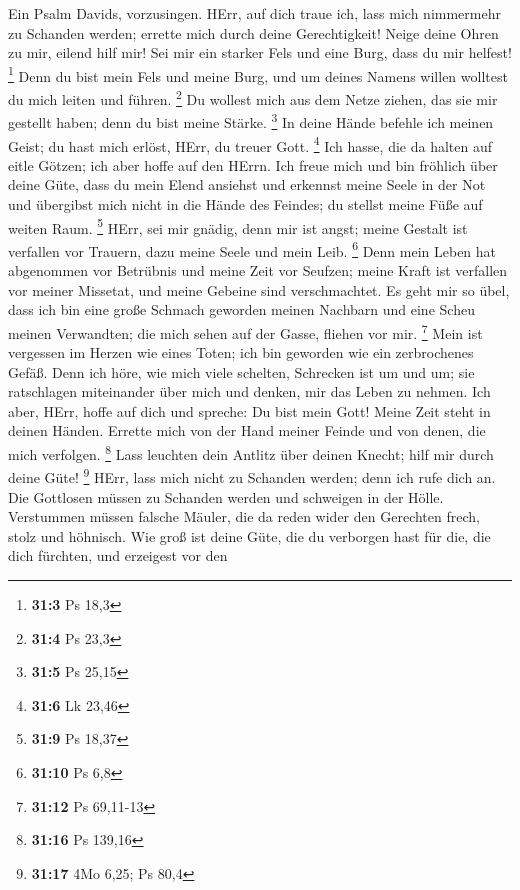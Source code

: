 Ein Psalm Davids, vorzusingen.  HErr, auf
dich traue ich, lass mich nimmermehr zu Schanden werden; errette mich
durch deine Gerechtigkeit!  Neige deine Ohren zu mir,
eilend hilf mir! Sei mir ein starker Fels und eine Burg, dass du mir
helfest! \footnote{\textbf{31:3} Ps 18,3}  Denn du bist
mein Fels und meine Burg, und um deines Namens willen wolltest du mich
leiten und führen. \footnote{\textbf{31:4} Ps 23,3}  Du
wollest mich aus dem Netze ziehen, das sie mir gestellt haben; denn du
bist meine Stärke. \footnote{\textbf{31:5} Ps 25,15}  In
deine Hände befehle ich meinen Geist; du hast mich erlöst, HErr, du
treuer Gott. \footnote{\textbf{31:6} Lk 23,46}  Ich hasse,
die da halten auf eitle Götzen; ich aber hoffe auf den HErrn.
 Ich freue mich und bin fröhlich über deine Güte, dass du
mein Elend ansiehst und erkennst meine Seele in der Not 
und übergibst mich nicht in die Hände des Feindes; du stellst meine Füße
auf weiten Raum. \footnote{\textbf{31:9} Ps 18,37}  HErr,
sei mir gnädig, denn mir ist angst; meine Gestalt ist verfallen vor
Trauern, dazu meine Seele und mein Leib. \footnote{\textbf{31:10} Ps 6,8}
 Denn mein Leben hat abgenommen vor Betrübnis und meine
Zeit vor Seufzen; meine Kraft ist verfallen vor meiner Missetat, und
meine Gebeine sind verschmachtet.  Es geht mir so übel,
dass ich bin eine große Schmach geworden meinen Nachbarn und eine Scheu
meinen Verwandten; die mich sehen auf der Gasse, fliehen vor mir.
\footnote{\textbf{31:12} Ps 69,11-13}  Mein ist vergessen
im Herzen wie eines Toten; ich bin geworden wie ein zerbrochenes Gefäß.
 Denn ich höre, wie mich viele schelten, Schrecken ist um
und um; sie ratschlagen miteinander über mich und denken, mir das Leben
zu nehmen.  Ich aber, HErr, hoffe auf dich und spreche:
Du bist mein Gott!  Meine Zeit steht in deinen Händen.
Errette mich von der Hand meiner Feinde und von denen, die mich
verfolgen. \footnote{\textbf{31:16} Ps 139,16}  Lass
leuchten dein Antlitz über deinen Knecht; hilf mir durch deine Güte!
\footnote{\textbf{31:17} 4Mo 6,25; Ps 80,4}  HErr, lass
mich nicht zu Schanden werden; denn ich rufe dich an. Die Gottlosen
müssen zu Schanden werden und schweigen in der Hölle. 
Verstummen müssen falsche Mäuler, die da reden wider den Gerechten
frech, stolz und höhnisch.  Wie groß ist deine Güte, die
du verborgen hast für die, die dich fürchten, und erzeigest vor den

